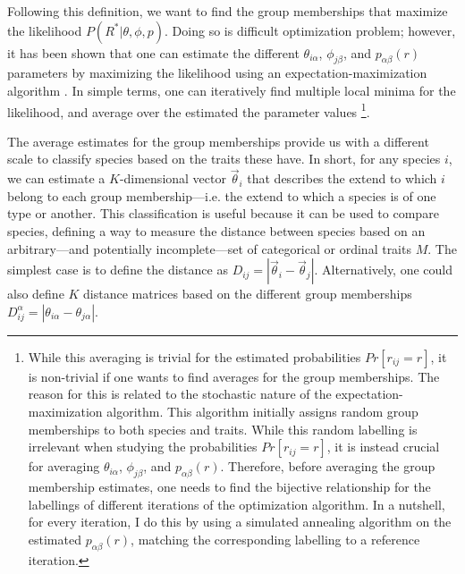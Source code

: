 \documentclass[11pt, a4paper]{article}
\begin{document}
Following this definition, we want to find the group memberships that maximize the likelihood $P\left(R^{*}|\theta, \phi, p\right)$. Doing so is difficult optimization problem; however, it has been shown that one can estimate the different $\theta_{i\alpha}$, $\phi_{j\beta}$, and $p_{\alpha\beta}\left(r\right)$ parameters by maximizing the likelihood using an expectation-maximization algorithm \citep{godoy-loriteAccurateScalableSocial2016, tarres-deulofeuTensorialBipartiteBlock2019}. In simple terms, one can iteratively find multiple local minima for the likelihood, and average over the estimated the parameter values \citep{godoy-loriteAccurateScalableSocial2016}\footnote[2]{
While this averaging is trivial for the estimated probabilities $Pr[r_{ij}=r]$, it is non-trivial if one wants to find averages for the group memberships. The reason for this is related to the stochastic nature of the expectation-maximization algorithm. This algorithm initially assigns random group memberships to both species and traits. While this random labelling is irrelevant when studying the probabilities $Pr[r_{ij}=r]$, it is instead crucial for averaging $\theta_{i\alpha}$, $\phi_{j\beta}$, and $p_{\alpha\beta}\left(r\right)$. Therefore, before averaging the group membership estimates, one needs to find the bijective relationship for the labellings of different iterations of the optimization algorithm. In a nutshell, for every iteration, I do this by using a simulated annealing algorithm on the estimated $p_{\alpha\beta}\left(r\right)$, matching the corresponding labelling to a reference iteration.}. 

The average estimates for the group memberships provide us with a different scale to classify species based on the traits these have. In short, for any species $i$, we can estimate a $K$-dimensional vector $\vec{\theta}_{i}$ that describes the extend to which $i$ belong to each group membership---i.e. the extend to which a species is of one type or another. This classification is useful because it can be used to compare species, defining a way to measure the distance between species based on an arbitrary---and potentially incomplete---set of categorical or ordinal traits $M$. The simplest case is to define the distance as $D_{ij} = |\vec{\theta}_{i}-\vec{\theta}_{j}|$. Alternatively, one could also define $K$ distance matrices based on the different group memberships $D^{\alpha}_{ij} = |\theta_{i\alpha}-\theta_{j\alpha}|$.
\end{document}
